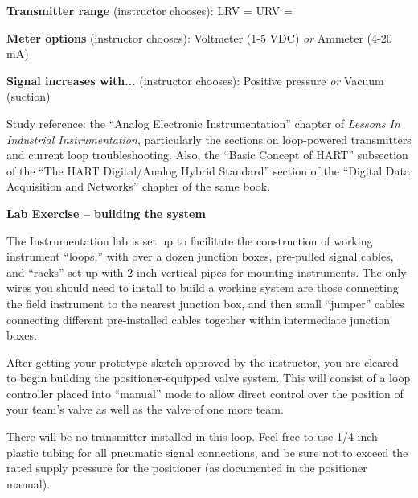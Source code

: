 \vskip 10pt

\noindent
{\bf Transmitter range} (instructor chooses): \hskip 20pt LRV = \underbar{\hskip 50pt} \hskip 20pt URV = \underbar{\hskip 50pt}

\vskip 10pt

\noindent
{\bf Meter options} (instructor chooses): \hskip 20pt \underbar{\hskip 20pt} Voltmeter (1-5 VDC) \hskip 10pt {\it or} \hskip 10pt \underbar{\hskip 20pt} Ammeter (4-20 mA)

\vskip 10pt

\noindent
{\bf Signal increases with...} (instructor chooses): \hskip 20pt \underbar{\hskip 20pt} Positive pressure \hskip 10pt {\it or} \hskip 10pt \underbar{\hskip 20pt} Vacuum (suction)

\vskip 10pt

\vfil

Study reference: the ``Analog Electronic Instrumentation'' chapter of {\it Lessons In Industrial Instrumentation}, particularly the sections on loop-powered transmitters and current loop troubleshooting.  Also, the ``Basic Concept of HART'' subsection of the ``The HART Digital/Analog Hybrid Standard'' section of the ``Digital Data Acquisition and Networks'' chapter of the same book.







\vfil \eject

\noindent
{\bf Lab Exercise -- building the system}

\vskip 5pt

The Instrumentation lab is set up to facilitate the construction of working instrument ``loops,'' with over a dozen junction boxes, pre-pulled signal cables, and ``racks'' set up with 2-inch vertical pipes for mounting instruments.  The only wires you should need to install to build a working system are those connecting the field instrument to the nearest junction box, and then small ``jumper'' cables connecting different pre-installed cables together within intermediate junction boxes.

After getting your prototype sketch approved by the instructor, you are cleared to begin building the positioner-equipped valve system.  This will consist of a loop controller placed into ``manual'' mode to allow direct control over the position of your team's valve as well as the valve of one more team.  

There will be no transmitter installed in this loop.  Feel free to use 1/4 inch plastic tubing for all pneumatic signal connections, and be sure not to exceed the rated supply pressure for the positioner (as documented in the positioner manual).

